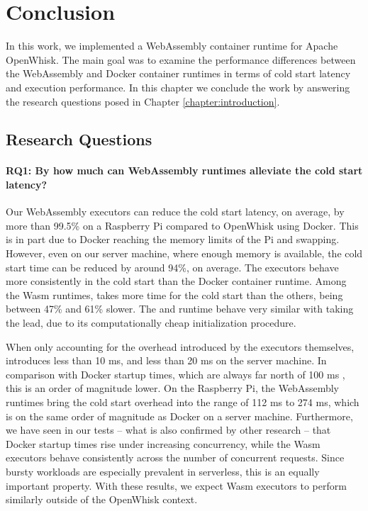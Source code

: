 \chapter{Conclusion}
\label{chapter:conclusion}

In this work, we implemented a WebAssembly container runtime for Apache OpenWhisk. The main goal was to examine the performance differences between the WebAssembly and Docker container runtimes in terms of cold start latency and execution performance. In this chapter we conclude the work by answering the research questions posed in Chapter \ref{chapter:introduction}.

\section{Research Questions}

\subsubsection*{RQ1: By how much can WebAssembly runtimes alleviate the cold start latency?}

Our WebAssembly executors can reduce the cold start latency, on average, by more than 99.5\% on a Raspberry Pi compared to OpenWhisk using Docker. This is in part due to Docker reaching the memory limits of the Pi and swapping. However, even on our server machine, where enough memory is available, the cold start time can be reduced by around 94\%, on average. The executors behave more consistently in the cold start than the Docker container runtime. Among the Wasm runtimes,  takes more time for the cold start than the others, being between 47\% and 61\% slower. The  and  runtime behave very similar with  taking the lead, due to its computationally cheap initialization procedure.

When only accounting for the overhead introduced by the executors themselves,  introduces less than 10 ms, and  less than 20 ms on the server machine. In comparison with Docker startup times, which are always far north of 100 ms \cite{Wang2018, Manner2018}, this is an order of magnitude lower.
On the Raspberry Pi, the WebAssembly runtimes bring the cold start overhead into the range of 112 ms to 274 ms, which is on the same order of magnitude as Docker on a server machine.
Furthermore, we have seen in our tests -- what is also confirmed by other research \cite{Mohan2019} -- that Docker startup times rise under increasing concurrency, while the Wasm executors behave consistently across the number of concurrent requests. Since bursty workloads are especially prevalent in serverless, this is an equally important property. With these results, we expect Wasm executors to perform similarly outside of the OpenWhisk context.

